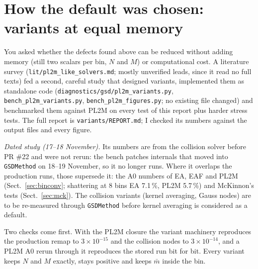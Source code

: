 \documentclass[11pt,a4paper]{article}
\begin{document}
\section{How the default was chosen: variants at equal memory}\label{sec:variants}

You asked whether the defects found above can be reduced without adding memory (still two scalars per bin, $N$ and
$M$) or computational cost. A literature survey (\texttt{lit/pl2m\_like\_solvers.md}; mostly unverified leads, since it
read no full texts) fed a second, careful study that designed variants, implemented them as standalone code
(\texttt{diagnostics/gsd/pl2m\_variants.py}, \texttt{bench\_pl2m\_variants.py}, \texttt{bench\_pl2m\_figures.py}; no
existing file changed) and benchmarked them against PL2M on every test of this report plus harder stress tests. The
full report is \texttt{variants/REPORT.md}; I checked its numbers against the output files and every figure.

\emph{Dated study (17--18 November).} Its numbers are from the collision solver before PR \#22 and were not rerun: the
bench patches internals that moved into \texttt{GSDMethod} on 18--19 November, so it no longer runs. Where it overlaps
the production runs, those supersede it: the A0 numbers of EA, EAF and PL2M (Sect.~\ref{sec:binconv}; shattering at 8
bins EA 7.1\,\%, PL2M 5.7\,\%) and McKinnon's tests (Sect.~\ref{sec:mck}). The collision variants (kernel averaging,
Gauss nodes) are to be re-measured through \texttt{GSDMethod} before kernel averaging is considered as a default.

Two checks come first. With the PL2M closure the variant machinery reproduces the production remap to $3\times10^{-15}$
and the collision nodes to $3\times10^{-14}$, and a PL2M A0 rerun through it reproduces the stored run bit for bit.
Every variant keeps $N$ and $M$ exactly, stays positive and keeps $\bar m$ inside the bin.
\end{document}

